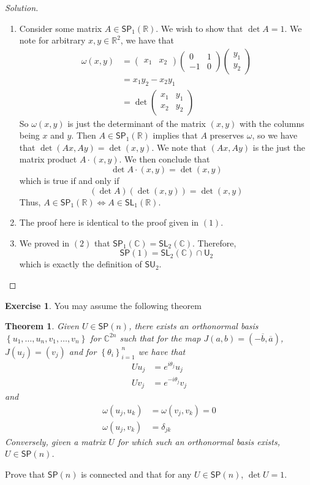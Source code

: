 \documentclass[psamsfonts]{amsart}
\newtheorem*{thm*}{Theorem}
\theoremstyle{definition}
\newtheorem{exer}[thm]{Exercise}
\theoremstyle{remark}
\newcommand{\R}{\mathbb{R}}
\newcommand{\C}{\mathbb{C}}
\newcommand{\SL}{\mathsf{SL}}
\newcommand{\SP}{\mathsf{SP}}
\newcommand{\SU}{\mathsf{SU}}
\newcommand{\set}[1]{\left\lbrace#1 \right\rbrace}
\begin{document}
\begin{proof}[Solution]
$ $ \\
\begin{enumerate}
\item Consider some matrix $A \in \SP_1(\R)$. We wish to show that $\det A = 1$. We note for arbitrary $x,y \in \R^2$, we have that 
\begin{align*}
\omega(x,y) &= \begin{pmatrix}
x_1 & x_2
\end{pmatrix} \begin{pmatrix}
0 & 1 \\
-1 & 0
\end{pmatrix} \begin{pmatrix}
y_1 \\
y_2
\end{pmatrix} \\
&= x_1y_2-x_2y_1 \\
&= \det \begin{pmatrix}
x_1 & y_1 \\
x_2 & y_2
\end{pmatrix}
\end{align*}
So $\omega(x,y)$ is just the determinant of the matrix $(x,y)$ with the columns being $x$ and $y$. Then $A \in \SP_1(\R)$ implies that $A$ preserves $\omega$, so we have that $\det (Ax,Ay) = \det (x,y)$. We note that $(Ax,Ay)$ is the just the matrix product $A \cdot (x,y)$. We then conclude that 
$$\det A \cdot (x,y) = \det (x,y) $$
which is true if and only if
$$ (\det A)(\det (x,y)) =  \det (x,y) $$
Thus, $A \in \SP_1(\R) \iff A \in \SL_1(\R)$.
\item The proof here is identical to the proof given in $(1)$.
\item We proved in $(2)$ that $\SP_1(\C) = \SL_2(\C)$. Therefore, 
$$\SP(1) = \SL_2(\C) \cap \mathsf{U}_2$$
 which is exactly the definition of $\SU_2$.
\end{enumerate}
\end{proof}

\setcounter{thm}{6}

\begin{exer}
You may assume the following theorem
\begin{thm*}
Given $U \in \SP(n)$, there exists an orthonormal basis $\set{u_1, \ldots, u_n, v_1, \ldots, v_n}$  for $\C^{2n}$ such that for the map $J(a,b) = (-\overline{b},\overline{a})$, $J(u_j) = (v_j)$ and for $\set{\theta_i}_{i = 1}^n$ we have that
\begin{align*}
Uu_j &= e^{i\theta_j}u_j\\
Uv_j &= e^{-i\theta_j}v_j
\end{align*}
and 
\begin{align*}
\omega(u_j, u_k) &= \omega(v_j, v_k) = 0 \\
\omega(u_j,v_k) &= \delta_{jk}
\end{align*}
Conversely, given a matrix $U$ for which such an orthonormal basis exists, $U \in \SP(n)$.
\end{thm*}
Prove that $\SP(n)$ is connected and that for any $U \in \SP(n)$, $\det U = 1$.
\end{exer}
\end{document}
